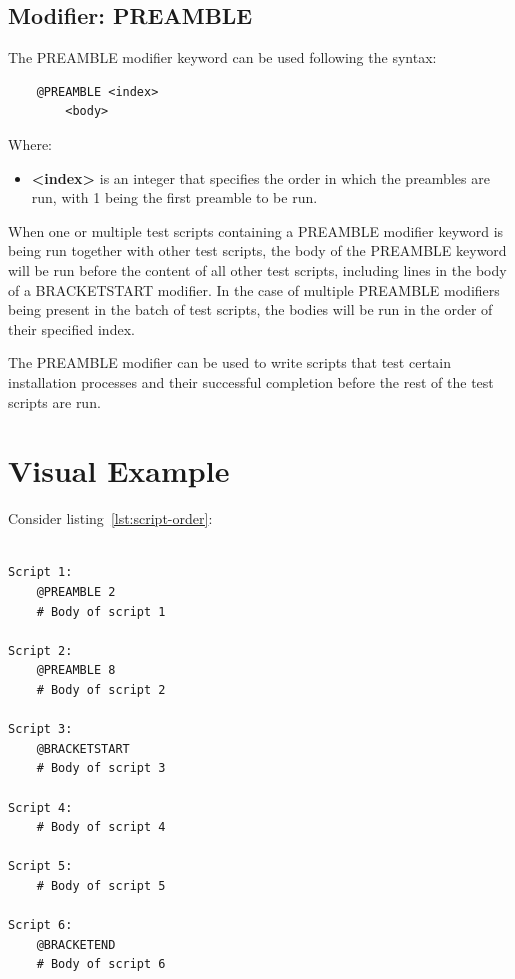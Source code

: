 \subsection{Modifier: PREAMBLE}

The PREAMBLE modifier keyword can be used following the syntax:

\begin{verbatim}
    @PREAMBLE <index>
        <body>
\end{verbatim}

Where:
\begin{itemize}
    \item \textbf{<index>} is an integer that specifies the order in which the preambles are run, with 1 being the first preamble to be run.
\end{itemize}

When one or multiple test scripts containing a PREAMBLE modifier keyword is being run together with other test scripts, the body of the PREAMBLE keyword will be run before the content of all other test scripts, including lines in the body of a BRACKETSTART modifier. In the case of multiple PREAMBLE modifiers being present in the batch of test scripts, the bodies will be run in the order of their specified index.

The PREAMBLE modifier can be used to write scripts that test certain installation processes and their successful completion before the rest of the test scripts are run.

\section{Visual Example}

Consider listing~\ref{lst:script-order}:

\begin{lstlisting}[caption={Simple example depicting how test scripts with certain keywords would be ordered}, label={lst:script-order}]

Script 1:
    @PREAMBLE 2
    # Body of script 1

Script 2: 
    @PREAMBLE 8
    # Body of script 2

Script 3:
    @BRACKETSTART
    # Body of script 3

Script 4:
    # Body of script 4

Script 5:
    # Body of script 5

Script 6:
    @BRACKETEND
    # Body of script 6

\end{lstlisting}

